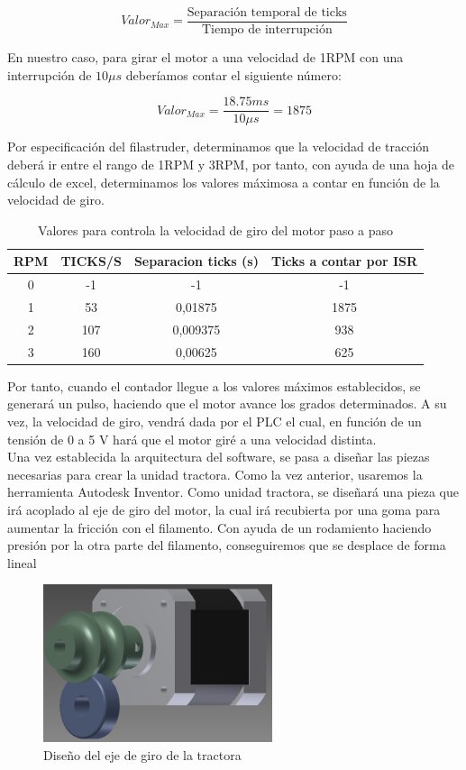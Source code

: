 $$ Valor_{Max} = \frac{\text{Separación temporal de ticks}}{\text{Tiempo de interrupción}}$$

En nuestro caso, para girar el motor a una velocidad de 1RPM con una interrupción de $10\mu s$ deberíamos contar el siguiente número:

$$Valor_{Max} = \frac{18.75 ms}{10\mu s} = 1875$$

Por especificación del filastruder, determinamos que la velocidad de tracción deberá ir entre el rango de 1RPM y 3RPM, por tanto, con ayuda de una hoja de cálculo de excel, determinamos los valores máximosa a contar en función de la velocidad de giro.

\begin{table}[H]
    \centering
    \begin{tabular}{cccc}
        \multicolumn{1}{l}{{\bf RPM}} & \multicolumn{1}{l}{{\bf TICKS/S}} & \multicolumn{1}{l}{{\bf Separacion ticks (s)}} & \multicolumn{1}{l}{{\bf Ticks a contar por ISR}} \\
        \hline
        0 & -1 & -1 & -1 \\
        1 & 53 & 0,01875 & 1875 \\
        2 & 107 & 0,009375 & 938 \\
        3 & 160 & 0,00625 & 625
    \end{tabular}
    \caption{Valores para controla la velocidad de giro del motor paso a paso}
    \label{tab:valores_paso_paso}
\end{table}

Por tanto, cuando el contador llegue a los valores máximos establecidos, se generará un pulso, haciendo que el motor avance los grados determinados. A su vez, la velocidad de giro, vendrá dada por el PLC el cual, en función de un tensión de 0 a 5 V hará que el motor giré a una velocidad distinta.\\

Una vez establecida la arquitectura del software, se pasa a diseñar las piezas necesarias para crear la unidad tractora. Como la vez anterior, usaremos la herramienta Autodesk Inventor. Como unidad tractora, se diseñará una pieza que irá acoplado al eje de giro del motor, la cual irá recubierta por una goma para aumentar la fricción con el filamento. Con ayuda de un rodamiento haciendo presión por la otra parte del filamento, conseguiremos que se desplace de forma lineal

\begin{figure}[H]
    \centering
    \includegraphics[width=0.6\textwidth]{images/producciones/tractora/motor.png}
    \caption{Diseño del eje de giro de la tractora}
    \label{fig:tractora}
\end{figure}


